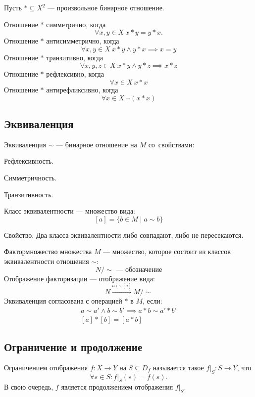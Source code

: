 Пусть $\ast\subseteq X^2$ --- произвольное бинарное отношение.

Отношение $\ast$ {\bold симметрично}, когда
$$\forall x,y\in X\ x\ast y=y\ast x.$$
Отношение $\ast$ {\bold антисимметрично}, когда
$$\forall x,y\in X\ x\ast y\land y\ast x\implies x=y$$
Отношение $\ast$ {\bold транзитивно}, когда
$$\forall x,y,z\in X\ x\ast y\land y\ast z\implies x\ast z$$
Отношение $\ast$ {\bold рефлексивно}, когда
$$\forall x\in X\ x\ast x$$
Отношение $\ast$ {\bold антирефликсивно}, когда
$$\forall x\in X\ \lnot (x\ast x)$$

\subsection{Эквиваленция}

{\bold Эквиваленция} $\sim$ --- бинарное отношение на $M$ со~свойствами:
\begin{list*}[][\#]
\item Рефлексивность.
\item Симметричность.
\item Транзитивность.
\end{list*}

{\bold Класс эквивалентности} --- множество вида:
$$[a]=\{b\in M\mid a\sim b\}$$
\begin{theorem}
{\bold Свойство.} Два класса эквивалентности либо совпадают, либо не пересекаются.
\end{theorem}
{\bold Фактормножество} множества $M$ --- множество, которое состоит из классов эквивалентности отношения $\sim$:
$$N\slash\sim\text{ --- обозначение}$$
{\bold Отображение факторизации} --- отображение вида:
$$N\xrightarrow{a\mapsto [a]} M\slash\sim$$
Эквиваленция {\bold согласована} с операцией $\ast$ в $M$, если:
$$\begin{gathered}
a\sim a'\land b\sim b'\implies a\ast b\sim a'\ast b'\\
[a]\ast[b]=[a\ast b]
\end{gathered}$$

\subsection{Ограничение и продолжение}

{\ital Ограничением} отображения $f\colon X\to Y$ на $S\subseteq D_f$ называется
такое $f\vert_S\colon S\to Y$, что
$$\forall s\in S\colon f\vert_S(s)=f(s).$$
В свою очередь, $f$ является {\ital продолжением} отображения $f\vert_S$.

